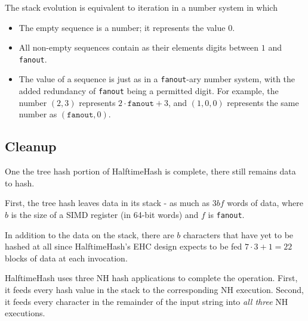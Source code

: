 \documentclass[sigconf, nonacm]{acmart}
\begin{document}
The stack evolution is equivalent to iteration in a number system in which

\begin{itemize}
\item The empty sequence is a number; it represents the value $0$.
\item All non-empty sequences contain as their elements digits between $1$ and \texttt{fanout}.
\item The value of a sequence is just as in a \texttt{fanout}-ary number system, with the added redundancy of \texttt{fanout} being a permitted digit.
  For example, the number $(2,3)$ represents $2\cdot\texttt{fanout} + 3$, and $(1,0,0)$ represents the same number as $(\texttt{fanout},0)$.
\end{itemize}





\subsection{Cleanup}

One the tree hash portion of HalftimeHash is complete, there still remains data to hash.

First, the tree hash leaves data in its stack - as much as $3bf$ words of data, where $b$ is the size of a SIMD register (in 64-bit words) and $f$ is \texttt{fanout}.

In addition to the data on the stack, there are $b$ characters that have yet to be hashed at all since HalftimeHash's EHC design expects to be fed $7 \cdot 3 + 1 = 22$ blocks of data at each invocation.

HalftimeHash uses three NH hash applications to complete the operation.
First, it feeds every hash value in the stack to the corresponding NH execution.
Second, it feeds every character in the remainder of the input string into {\em all three} NH executions.
\end{document}
